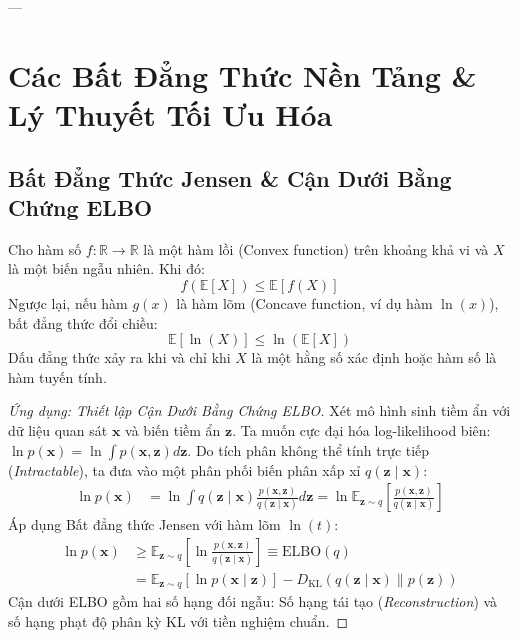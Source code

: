 ---

\section{Các Bất Đẳng Thức Nền Tảng \& Lý Thuyết Tối Ưu Hóa}
\label{sec:app-math-inequalities}

\subsection{Bất Đẳng Thức Jensen \& Cận Dưới Bằng Chứng ELBO}

\begin{theorem}
Cho hàm số $f: \mathbb{R} \to \mathbb{R}$ là một hàm lồi (Convex function) trên khoảng khả vi và $X$ là một biến ngẫu nhiên. Khi đó:
\begin{equation}
f(\mathbb{E}[X]) \le \mathbb{E}[f(X)]
\end{equation}
Ngược lại, nếu hàm $g(x)$ là hàm lõm (Concave function, ví dụ hàm $\ln(x)$), bất đẳng thức đổi chiều:
\begin{equation}
\mathbb{E}[\ln(X)] \le \ln(\mathbb{E}[X])
\end{equation}
Dấu đẳng thức xảy ra khi và chỉ khi $X$ là một hằng số xác định hoặc hàm số là hàm tuyến tính.
\end{theorem}

\begin{proof}[Ứng dụng: Thiết lập Cận Dưới Bằng Chứng ELBO]
Xét mô hình sinh tiềm ẩn với dữ liệu quan sát $\mathbf{x}$ và biến tiềm ẩn $\mathbf{z}$. Ta muốn cực đại hóa log-likelihood biên: $\ln p(\mathbf{x}) = \ln \int p(\mathbf{x}, \mathbf{z}) d\mathbf{z}$.
Do tích phân không thể tính trực tiếp (\textit{Intractable}), ta đưa vào một phân phối biến phân xấp xỉ $q(\mathbf{z} \mid \mathbf{x})$:
\begin{align*}
\ln p(\mathbf{x}) &= \ln \int q(\mathbf{z} \mid \mathbf{x}) \frac{p(\mathbf{x}, \mathbf{z})}{q(\mathbf{z} \mid \mathbf{x})} d\mathbf{z} = \ln \mathbb{E}_{\mathbf{z} \sim q}\left[ \frac{p(\mathbf{x}, \mathbf{z})}{q(\mathbf{z} \mid \mathbf{x})} \right]
\end{align*}
Áp dụng Bất đẳng thức Jensen với hàm lõm $\ln(t)$:
\begin{align}
\ln p(\mathbf{x}) &\ge \mathbb{E}_{\mathbf{z} \sim q}\left[ \ln \frac{p(\mathbf{x}, \mathbf{z})}{q(\mathbf{z} \mid \mathbf{x})} \right] \equiv \text{ELBO}(q) \\
&= \mathbb{E}_{\mathbf{z} \sim q}[\ln p(\mathbf{x} \mid \mathbf{z})] - D_{\text{KL}}(q(\mathbf{z} \mid \mathbf{x}) \parallel p(\mathbf{z}))
\end{align}
Cận dưới ELBO gồm hai số hạng đối ngẫu: Số hạng tái tạo (\textit{Reconstruction}) và số hạng phạt độ phân kỳ KL với tiền nghiệm chuẩn.
\end{proof}


